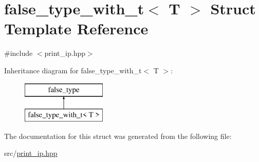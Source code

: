 \hypertarget{structfalse__type__with__t}{}\section{false\+\_\+type\+\_\+with\+\_\+t$<$ T $>$ Struct Template Reference}
\label{structfalse__type__with__t}


{\ttfamily \#include $<$print\+\_\+ip.\+hpp$>$}

Inheritance diagram for false\+\_\+type\+\_\+with\+\_\+t$<$ T $>$\+:\begin{figure}[H]
\begin{center}
\leavevmode
\includegraphics[height=2.000000cm]{structfalse__type__with__t}
\end{center}
\end{figure}


The documentation for this struct was generated from the following file\+:\begin{DoxyCompactItemize}
\item 
src/\hyperlink{print__ip_8hpp}{print\+\_\+ip.\+hpp}\end{DoxyCompactItemize}
